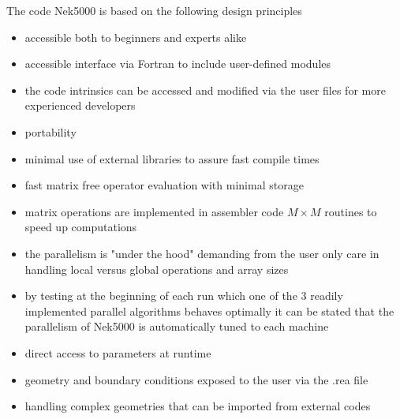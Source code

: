 The code Nek5000 is based on the following design principles
\begin{itemize}
\item accessible both to beginners and experts alike
\item accessible interface via Fortran to include user-defined modules
\item the code intrinsics can be accessed and modified via the user files for more experienced developers
\item portability
\item minimal use of external libraries to assure fast compile times
\item fast matrix free operator evaluation with minimal storage
\item matrix operations are implemented in assembler code \(M\times M\) routines to speed up computations
\item the parallelism is "under the hood" demanding from the user only care in handling local versus global operations and array sizes
\item by testing at the beginning of each run which one of the 3 readily implemented parallel algorithms behaves optimally it can be stated that the parallelism of Nek5000 is automatically tuned to each machine
\item direct access to parameters at runtime
\item geometry and boundary conditions exposed to the user via the .rea file
\item handling complex geometries that can be imported from external codes 
\end{itemize}